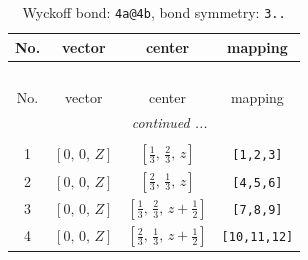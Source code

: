 \documentclass[fleqn,8pt]{jsarticle}
\begin{document}
\renewcommand{\arraystretch}{1.2}
\begin{longtable}{cccc}
\caption{Wyckoff bond: {\tt 4a@4b}, bond symmetry: {\tt 3..}}
 \\
 \hline \hline
No. & vector & center & mapping \\ \hline \endfirsthead

\multicolumn{3}{l}{\tablename\ \thetable{}} \\
 \hline \hline
No. & vector & center & mapping \\ \hline \endhead

 \hline \hline
\multicolumn{3}{r}{\footnotesize\it continued ...} \\ \endfoot

 \hline \hline
\multicolumn{3}{r}{} \\ \endlastfoot

1 & $\left[ 0,\, 0,\, Z \right]$ & $\left[ \frac{1}{3},\, \frac{2}{3},\, z \right]$ & {\tt [1,2,3]} \\ \hline
2 & $\left[ 0,\, 0,\, Z \right]$ & $\left[ \frac{2}{3},\, \frac{1}{3},\, z \right]$ & {\tt [4,5,6]} \\ \hline
3 & $\left[ 0,\, 0,\, Z \right]$ & $\left[ \frac{1}{3},\, \frac{2}{3},\, z + \frac{1}{2} \right]$ & {\tt [7,8,9]} \\ \hline
4 & $\left[ 0,\, 0,\, Z \right]$ & $\left[ \frac{2}{3},\, \frac{1}{3},\, z + \frac{1}{2} \right]$ & {\tt [10,11,12]} \\
\end{longtable}
\renewcommand{\arraystretch}{1.2}
\end{document}
